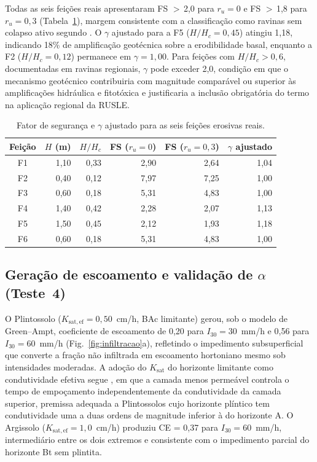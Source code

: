 \documentclass[preprint,review,12pt,authoryear]{elsarticle}
\begin{document}
Todas as seis feições reais apresentaram FS $>$\,2,0 para $r_u = 0$ e FS $>$\,1,8 para $r_u = 0{,}3$ (Tabela~\ref{tab:fs}), margem consistente com a classificação como ravinas sem colapso ativo segundo \citet{poesen_2018}. O $\gamma$ ajustado para a F5 ($H/H_c = 0{,}45$) atingiu 1,18, indicando 18\% de amplificação geotécnica sobre a erodibilidade basal, enquanto a F2 ($H/H_c = 0{,}12$) permanece em $\gamma = 1{,}00$. Para feições com $H/H_c > 0{,}6$, documentadas em ravinas regionais, $\gamma$ pode exceder 2,0, condição em que o mecanismo geotécnico contribuiria com magnitude comparável ou superior às amplificações hidráulica e fitotóxica e justificaria a inclusão obrigatória do termo na aplicação regional da RUSLE.

\begin{table}[htbp]
\centering
\caption{Fator de segurança e $\gamma$ ajustado para as seis feições erosivas reais.}
\label{tab:fs}
\small
\begin{tabular}{@{}c r r r r r@{}}
\toprule
Feição & $H$ (m) & $H/H_c$ & FS ($r_u = 0$) & FS ($r_u = 0{,}3$) & $\gamma$ ajustado \\
\midrule
F1 & 1,10 & 0,33 & 2,90 & 2,64 & 1,04 \\
F2 & 0,40 & 0,12 & 7,97 & 7,25 & 1,00 \\
F3 & 0,60 & 0,18 & 5,31 & 4,83 & 1,00 \\
F4 & 1,40 & 0,42 & 2,28 & 2,07 & 1,13 \\
F5 & 1,50 & 0,45 & 2,12 & 1,93 & 1,18 \\
F6 & 0,60 & 0,18 & 5,31 & 4,83 & 1,00 \\
\bottomrule
\end{tabular}
\end{table}

\subsection{Geração de escoamento e validação de $\alpha$ (Teste~4)}

O Plintossolo ($K_{\mathrm{sat,ef}} = 0{,}50$~cm/h, BAc limitante) gerou, sob o modelo de Green--Ampt, coeficiente de escoamento de 0,20 para $I_{30} = 30$~mm/h e 0,56 para $I_{30} = 60$~mm/h (Fig.~\ref{fig:infiltracao}a), refletindo o impedimento subsuperficial que converte a fração não infiltrada em escoamento hortoniano mesmo sob intensidades moderadas. A adoção do $K_{\mathrm{sat}}$ do horizonte limitante como condutividade efetiva segue \citet{wang_et_al_1999}, em que a camada menos permeável controla o tempo de empoçamento independentemente da condutividade da camada superior, premissa adequada a Plintossolos cujo horizonte plíntico tem condutividade uma a duas ordens de magnitude inferior à do horizonte A. O Argissolo ($K_{\mathrm{sat,ef}} = 1{,}0$~cm/h) produziu CE = 0,37 para $I_{30} = 60$~mm/h, intermediário entre os dois extremos e consistente com o impedimento parcial do horizonte Bt sem plintita.
\end{document}
